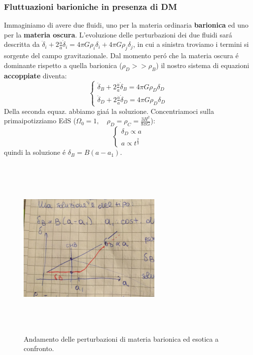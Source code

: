\documentclass[12pt, a4paper]{article}
\begin{document}
\subsubsection{Fluttuazioni barioniche in presenza di DM}
Immaginiamo di avere due fluidi, uno per la materia ordinaria \textbf{barionica} ed uno per la \textbf{materia oscura}. L'evoluzione delle perturbazioni dei due fluidi sar\'{a} descritta da $\ddot{\delta}_i+2\frac{\dot{a}}{a}\dot{\delta}_i=4\pi G \rho_i \delta_i+4\pi G \rho_j\delta_j$, in cui a sinistra troviamo i termini si sorgente del campo gravitazionale. Dal momento per\'{o} che la materia oscura \'{e} dominante rispetto a quella barionica ($\rho_D>>\rho_B$) il nostro sistema di equazioni \textbf{accoppiate} diventa:
\begin{equation}
\begin{cases}
\ddot{\delta}_B+2\frac{\dot{a}}{a}\dot{\delta}_B=4\pi G \rho_D\delta_D
\\
\ddot{\delta}_D+2\frac{\dot{a}}{a}\dot{\delta}_D=4\pi G \rho_D\delta_D
\end{cases}
\end{equation}
Della seconda equaz. abbiamo gia\'{a} la soluzione. Concentriamoci sulla primaipotizziamo EdS ($\Omega_0=1, \quad \rho_D=\rho_C=\frac{3H^2}{8\pi G}$):
\begin{equation}
\begin{cases}
\delta_D\propto a
\\
a\propto t^{\frac{2}{3}}
\end{cases}
\end{equation}
quindi la soluzione \'{e} $\delta_B= B(a-a_1)$. 
\begin{figure}[htp]
\centering
\includegraphics[width=7cm, height=9cm]{images/pertosc.jpeg}
\caption{Andamento delle perturbazioni di materia barionica ed esotica a confronto.}
\label{fig:pertosc}
\end{figure}
\end{document}
